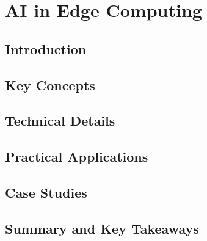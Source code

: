 ﻿%

\chapter{AI in Edge Computing}
\label{ch:chapter-18}

\section{Introduction}


\section{Key Concepts}


\section{Technical Details}


\section{Practical Applications}


\section{Case Studies}


\section{Summary and Key Takeaways}


